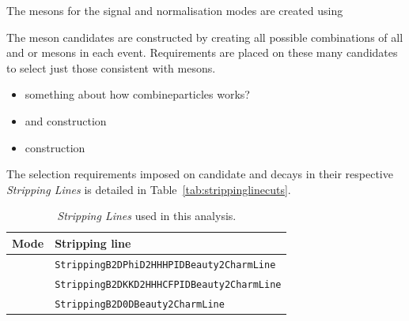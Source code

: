 The \Dsp mesons for the signal and normalisation modes are created using 





The \Bp meson candidates are constructed by creating all possible combinations of all \Dsp and \phiz or \Dzb mesons in each event.
Requirements are placed on these many candidates to select just those consistent with \Bp mesons.


{\color{Red}
\begin{itemize}
\item something about how combineparticles works?
\item \Dsp and \phiz construction 
\item \Bp construction
\end{itemize}
}


The selection requirements imposed on candidate \decay{\Bp}{\Dsp\phiz} and \decay{\Bp}{\Dsp\Kp\Km} decays in their respective \emph{Stripping Lines} is detailed in Table~\ref{tab:strippinglinecuts}. 


\begin{table}[t]
\begin{center}
\begin{tabular}{l l}

\hline
Mode & Stripping line \\ 
\hline
\decay{\Bp}{\Dsp\phiz}        & \texttt{StrippingB2DPhiD2HHHPIDBeauty2CharmLine}    \\
\decay{\Bp}{\Dsp\Kp\Km}       & \texttt{StrippingB2DKKD2HHHCFPIDBeauty2CharmLine}   \\
\decay{\Bp}{\Dsp\Dzb}         & \texttt{StrippingB2D0DBeauty2CharmLine}             \\
\hline
\end{tabular}
\end{center}
\caption{\emph{Stripping Lines} used in this analysis.}
\label{tab:strippinglines}
\end{table}





